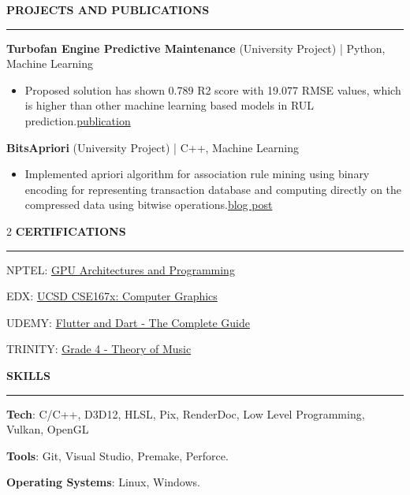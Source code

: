 \documentclass[a4paper, 11pt]{article}
\newenvironment{resumeSection}[1]
{
    \MakeUppercase{\Large\textbf{#1}}
    \medskip
    \hrule
    \begin{list}{}
    {
        \setlength\itemsep{-0.3em}
        \setlength\leftmargin{0em}
    }
    \vspace{-1em}
    \item[]
}
{   \end{list}  }
\newenvironment{sectionItems}
{
    \vspace{-0.5em}
    \begin{itemize}
    \setlength{\itemsep}{-0.7em}
}
{
    \end{itemize}
}
\begin{document}
\begin{resumeSection}{Projects and Publications}
    \item \textbf{Turbofan Engine Predictive Maintenance} (University Project) | {Python, Machine Learning}
    \begin{sectionItems}
        \setlength\itemsep{-0.5em}
        \item Proposed solution has shown 0.789 R2 score with 19.077 RMSE values, which is higher than other machine learning based models in RUL prediction.\hfill \href{https://www.sciencedirect.com/science/article/pii/S1877050925010610}{publication}
    \end{sectionItems}
    
    \item \textbf{BitsApriori} (University Project) | {C++, Machine Learning}
    \begin{sectionItems}
        \setlength\itemsep{-0.5em}
        \item Implemented apriori algorithm for association rule mining using binary encoding for representing transaction database and computing directly on the compressed data using bitwise operations.\hfill \href{https://jaynakum.github.io/blog/2/BitsApriori}{blog post}
    \end{sectionItems}
\end{resumeSection}

\medskip
\begin{multicols}{2}
\begin{resumeSection}{Certifications}
    \item NPTEL: \href{https://drive.google.com/file/d/1Lztoogwv_jMQIze_FJ7pvFZbglfMw4s2/view?usp=sharing}{GPU Architectures and Programming}
    \item EDX: \href{https://courses.edx.org/certificates/3e47add62a6b45269149bf91b91f1399}{UCSD CSE167x: Computer Graphics}
    \item UDEMY: \href{https://www.udemy.com/certificate/UC-2fce7723-1cc7-403d-a54b-09dbd5cd495e/}{Flutter and Dart - The Complete Guide}
    \item TRINITY: \href{https://drive.google.com/file/d/1S-b58wIceYXIlX24bubJy8Z2aT2lQV2d/view?usp=sharing}{Grade 4 - Theory of Music}
\end{resumeSection}
\columnbreak
\begin{resumeSection}{Skills}
    \item \textbf{Tech}: C/C++, D3D12, HLSL, Pix, RenderDoc, Low Level Programming, Vulkan, OpenGL
    \item \textbf{Tools}: Git, Visual Studio, Premake, Perforce.
    \item \textbf{Operating Systems}: Linux, Windows.
\end{resumeSection}
\end{multicols}
\end{document}
